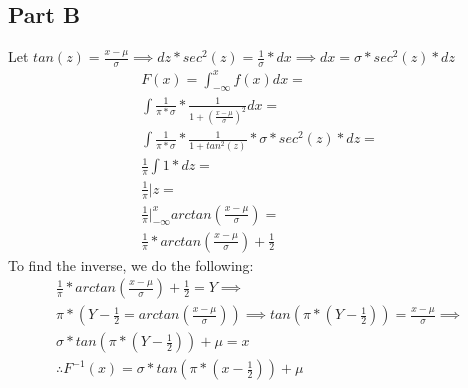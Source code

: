 \documentclass{article}\usepackage[]{graphicx}\usepackage[]{color}
\begin{document}
\subsection*{Part B}
Let $tan(z)=\frac{x-\mu}{\sigma}\implies dz*sec^{2}(z)=\frac{1}{\sigma}*dx \implies dx = \sigma * sec^{2}(z)*dz$
\begin{equation}
\begin{split}
F(x) = \int^{x}_{-\infty} f(x) dx = \\
\int \frac{1}{\pi*\sigma}*\frac{1}{1+(\frac{x-\mu}{\sigma})^2}dx = \\
\int \frac{1}{\pi*\sigma}*\frac{1}{1+tan^2(z)}*\sigma * sec^{2}(z)*dz = \\
\frac{1}{\pi} \int 1 *dz = \\
\frac{1}{\pi} \big|z = \\
\frac{1}{\pi} \big|^{x}_{-\infty}arctan(\frac{x-\mu}{\sigma}) = \\
\frac{1}{\pi}*arctan(\frac{x-\mu}{\sigma})+\frac{1}{2}
\end{split}
\end{equation}
To find the inverse, we do the following:
\begin{equation}
\begin{split}
\frac{1}{\pi}*arctan(\frac{x-\mu}{\sigma})+\frac{1}{2} = Y \implies \\
\pi*(Y-\frac{1}{2} = arctan(\frac{x-\mu}{\sigma})) \implies
tan(\pi*(Y-\frac{1}{2})) = \frac{x-\mu}{\sigma} \implies \\
\sigma*tan(\pi*(Y-\frac{1}{2})) + \mu = x \\
\therefore F^{-1}(x) = \sigma*tan(\pi*(x-\frac{1}{2})) + \mu
\end{split}
\end{equation}
\end{document}
